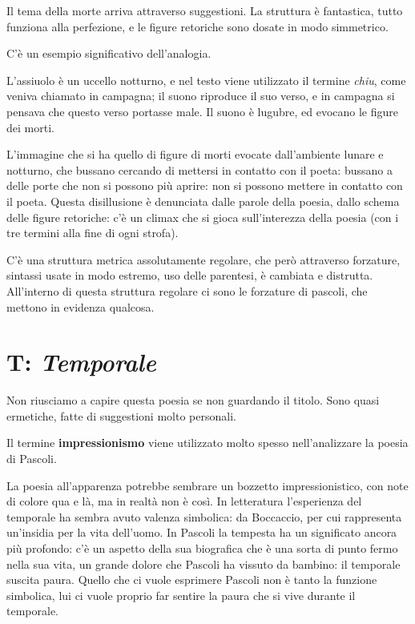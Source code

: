 Il tema della morte arriva attraverso suggestioni.
La struttura è fantastica, tutto funziona alla perfezione, e le figure retoriche sono dosate in modo simmetrico.

C'è un esempio significativo dell'analogia.

L'assiuolo è un uccello notturno, e nel testo viene utilizzato il termine \textit{chiu}, come veniva chiamato in campagna; il suono riproduce il suo verso, e in campagna si pensava che questo verso portasse male.
Il suono è lugubre, ed evocano le figure dei morti.

L'immagine che si ha quello di figure di morti evocate dall'ambiente lunare e notturno, che bussano cercando di mettersi in contatto con il poeta: bussano a delle porte che non si possono più aprire: non si possono mettere in contatto con il poeta.
Questa disillusione è denunciata dalle parole della poesia, dallo schema delle figure retoriche: c'è un climax che si gioca sull'interezza della poesia (con i tre termini alla fine di ogni strofa).

C'è una struttura metrica assolutamente regolare, che però attraverso forzature, sintassi usate in modo estremo, uso delle parentesi, è cambiata e distrutta. All'interno di questa struttura regolare ci sono le forzature di pascoli, che mettono in evidenza qualcosa.

\section{T: \textit{Temporale}}

Non riusciamo a capire questa poesia se non guardando il titolo. Sono quasi ermetiche, fatte di suggestioni molto personali.

Il termine \textbf{impressionismo} viene utilizzato molto spesso nell'analizzare la poesia di Pascoli.

La poesia all'apparenza potrebbe sembrare un bozzetto impressionistico, con note di colore qua e là, ma in realtà non è così.
In letteratura l'esperienza del temporale ha sembra avuto valenza simbolica: da Boccaccio, per cui rappresenta un'insidia per la vita dell'uomo.
In Pascoli la tempesta ha un significato ancora più profondo: c'è un aspetto della sua biografica che è una sorta di punto fermo nella sua vita, un grande dolore che Pascoli ha vissuto da bambino: il temporale suscita paura.
Quello che ci vuole esprimere Pascoli non è tanto la funzione simbolica, lui ci vuole proprio far sentire la paura che si vive durante il temporale.

